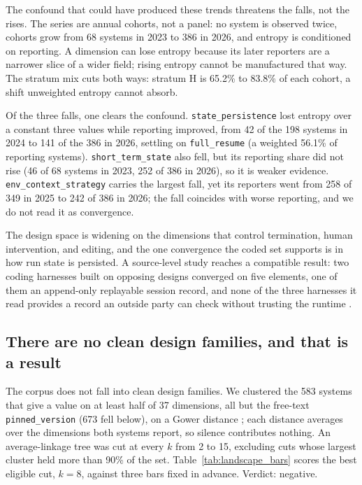 The confound that could have produced these trends threatens the falls, not the rises. The series are
annual cohorts, not a panel: no system is observed twice, cohorts grow from 68 systems in 2023 to 386 in
2026, and entropy is conditioned on reporting. A dimension can lose entropy because its later reporters
are a narrower slice of a wider field; rising entropy cannot be manufactured that way. The stratum mix
cuts both ways: stratum H is 65.2\% to 83.8\% of each cohort, a shift unweighted entropy cannot absorb.

Of the three falls, one clears the confound. \texttt{state\_persistence} lost entropy over a constant
three values while reporting improved, from 42 of the 198 systems in 2024 to 141 of the 386 in 2026,
settling on \texttt{full\_resume} (a weighted 56.1\% of reporting systems).
\texttt{short\_term\_state} also fell, but its reporting share did not rise (46 of 68 systems in 2023,
252 of 386 in 2026), so it is weaker evidence. \texttt{env\_context\_strategy} carries the largest fall,
yet its reporters went from 258 of 349 in 2025 to 242 of 386 in 2026; the fall coincides with worse
reporting, and we do not read it as convergence.

The design space is widening on the dimensions that control termination, human intervention, and
editing, and the one convergence the coded set supports is in how run state is persisted.
A source-level study reaches a compatible result: two coding harnesses built on opposing designs
converged on five elements, one of them an append-only replayable session record, and none of the
three harnesses it read provides a record an outside party can check without trusting the runtime
\citep{empire2026harnesses}.

\subsection{There are no clean design families, and that is a result}
\label{subsec:families}

The corpus does not fall into clean design families. We clustered the 583 systems that give a value on
at least half of 37 dimensions, all but the free-text \texttt{pinned\_version} (673 fell below), on a
Gower distance \citep{gower1971similarity}; each distance averages over the dimensions
both systems report, so silence contributes nothing. An average-linkage tree was cut at every $k$ from 2
to 15, excluding cuts whose largest cluster held more than 90\% of the set. Table~\ref{tab:landscape_bars}
scores the best eligible cut, $k = 8$, against three bars fixed in advance. Verdict: negative.

